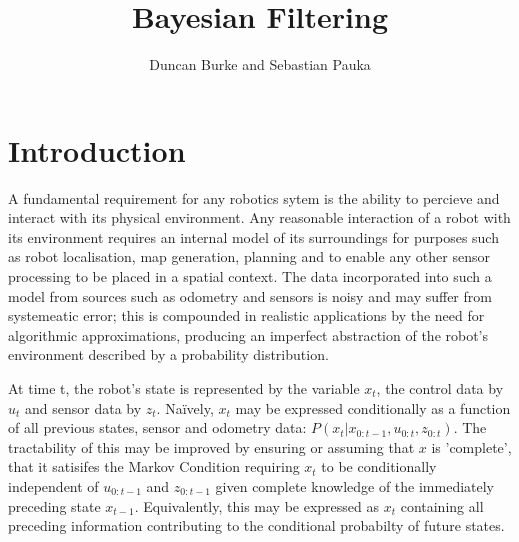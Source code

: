 \documentclass[english]{article}
\begin{document}
\title{Bayesian Filtering}

\author{Duncan Burke and Sebastian Pauka}
\maketitle


\section*{Introduction}

A fundamental requirement for any robotics sytem is the ability to percieve and interact with its physical environment. Any reasonable interaction of a robot with its environment requires an internal model of its surroundings for purposes such as robot localisation, map generation, planning and to enable any other sensor processing to be placed in a spatial context. The data incorporated into such a model from sources such as odometry and sensors is noisy and may suffer from systemeatic error; this is compounded in realistic applications by the need for algorithmic approximations, producing an imperfect abstraction of the robot's environment described by a probability distribution.


At time t, the robot's state is represented by the variable $x_t$, the control data by $u_t$ and sensor data by $z_t$. Na\"{i}vely, $x_t$ may be expressed conditionally as a function of all previous states, sensor and odometry data: $P(x_t | x_{0:t-1}, u_{0:t}, z_{0:t})$. The tractability of this may be improved by ensuring or assuming that $x$ is 'complete', that it satisifes the Markov Condition requiring $x_t$ to be conditionally independent of $u_{0:t-1}$ and $z_{0:t-1}$ given complete knowledge of the immediately preceding state $x_{t-1}$. Equivalently, this may be expressed as $x_t$ containing all preceding information contributing to the conditional probabilty of future states.
\end{document}
